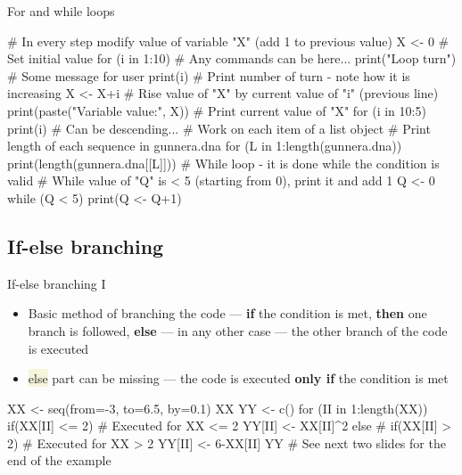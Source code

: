 \documentclass[compress, ucs, xelatex, 11pt, xcolor=svgnames, aspectratio=169,
	hyperref={
		bookmarks=true,
		unicode=true,
		colorlinks=true,
		pdftitle={Molecular data in R},
		plainpages=false,
		pdfauthor={Vojtech Zeisek},
		pdfsubject={Course about phylogeny and evolution in R},
		pdfcreator={XeLaTeX},
		pdfkeywords={R, evolution, phylogeny, molecular data},
		linkcolor=Crimson, %
		anchorcolor=Magenta, %
		citecolor=Magenta, %
		filecolor=Magenta, %
		menucolor=Magenta, %
		urlcolor=DodgerBlue, %
		pdftex},
	url={hyphens, lowtilde} %
	]{beamer}
\renewcommand{\texttt}[1]{\colorbox{Beige}{{\ttfamily #1}}}
\begin{document}
\begin{frame}[fragile]{For and while loops}
	\begin{spluscode}
    # In every step modify value of variable "X" (add 1 to previous value)
    X <- 0 # Set initial value
    for (i in 1:10) {
      # Any commands can be here...
      print("Loop turn") # Some message for user
      print(i) # Print number of turn - note how it is increasing
      X <- X+i # Rise value of "X" by current value of "i" (previous line)
      print(paste("Variable value:", X)) } # Print current value of "X"
    for (i in 10:5) { print(i) } # Can be descending...
    # Work on each item of a list object
    # Print length of each sequence in gunnera.dna
    for (L in 1:length(gunnera.dna)) {
      print(length(gunnera.dna[[L]])) }
    # While loop - it is done while the condition is valid
    # While value of "Q" is < 5 (starting from 0), print it and add 1
    Q <- 0
    while (Q < 5) { print(Q <- Q+1) }
	\end{spluscode}
\end{frame}

\subsection{If-else branching}

\begin{frame}[fragile]{If-else branching I}
	\begin{itemize}
		\item Basic method of branching the code --- \textbf{if} the condition is met, \textbf{then} one branch is followed, \textbf{else} --- in any other case --- the other branch of the code is executed
		\item \texttt{else} part can be missing --- the code is executed \textbf{only if} the condition is met
	\end{itemize}
	\begin{spluscode}
    XX <- seq(from=-3, to=6.5, by=0.1)
    XX
    YY <- c()
    for (II in 1:length(XX)) {
      if(XX[II] <= 2) { # Executed for XX <= 2
        YY[II] <- XX[II]^2
        } else { # if(XX[II] > 2) # Executed for XX > 2
          YY[II] <- 6-XX[II]
          }
      }
    YY # See next two slides for the end of the example
	\end{spluscode}
\end{frame}
\end{document}
